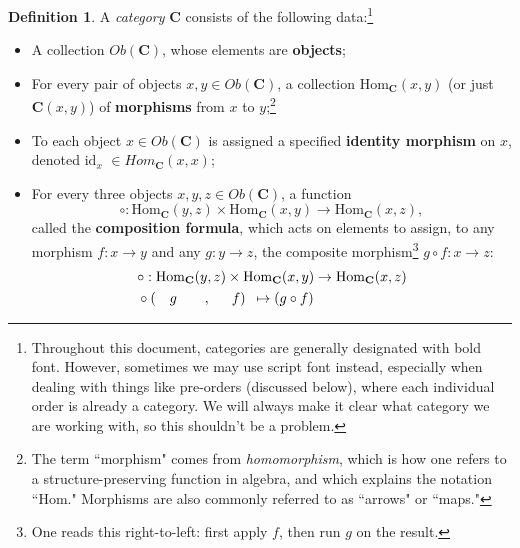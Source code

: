 \documentclass[a4paper]{book}
\theoremstyle{definition}
\theoremstyle{definition}
\newtheorem{definition}{Definition}[section]
\theoremstyle{definition}
\theoremstyle{theorem}
\theoremstyle{definition}
\begin{document}
\begin{definition}
	A \textit{category} $\textbf{C}$  consists of the following data:\footnote{Throughout this document, categories are generally designated with bold font. However, sometimes we may use script font instead, especially when dealing with things like pre-orders (discussed below), where each individual order is already a category. We will always make it clear what category we are working with, so this shouldn't be a problem.} 
	\begin{itemize}
		\item A collection $Ob(\textbf{C})$, whose elements are \textbf{objects}; 
		\item For every pair of objects $x, y \in Ob(\textbf{C})$, a collection $\text{Hom}_{\textbf{C}}(x,y)$ (or just $\textbf{C}(x,y)$) of \textbf{morphisms} from $x$ to $y$;\footnote{The term ``morphism" comes from \textit{homomorphism}, which is how one refers to a structure-preserving function in algebra, and which explains the notation ``Hom." Morphisms are also commonly referred to as ``arrows" or ``maps."} 
		\item To each object $x \in Ob(\textbf{C})$ is assigned a specified \textbf{identity morphism} on $x$, denoted $\text{id}_x$ $\in Hom_{\textbf{C}}(x,x)$;
		\item For every three objects $x,y,z \in Ob(\textbf{C})$, a function 
		\begin{equation*}
		\circ: \text{Hom}_{\textbf{C}}(y,z) \times \text{Hom}_{\textbf{C}}(x,y) \rightarrow \text{Hom}_{\textbf{C}}(x,z),
		\end{equation*}
		called the \textbf{composition formula}, which acts on elements to assign, to any morphism $f: x \rightarrow y$ and any $g: y \rightarrow z$, the composite morphism\footnote{One reads this right-to-left: first apply $f$, then run $g$ on the result.} $g \circ f: x \rightarrow z$: 
		\begin{equation*}
		\begin{split} 
		& \circ: \text{Hom}_{\textbf{C}}(y,z) \times \text{Hom}_{\textbf{C}}(x,y) \rightarrow \text{Hom}_{\textbf{C}}(x,z) \\
		& \circ( \hspace*{1em} g \hspace*{2em}, \hspace*{1.5em}f) \hspace*{0.5em}\mapsto (g \circ f)  
		\end{split} 
		\end{equation*}

\end{itemize}
\end{definition}
\end{document}
